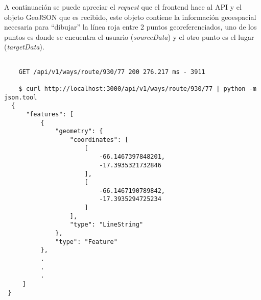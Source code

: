 
A continuación se puede apreciar el \emph{request} que el frontend hace al API y  el objeto GeoJSON que es recibido, este objeto contiene la información geoespacial necesaria para ``dibujar'' la línea roja entre 2 puntos georeferenciados, uno de los puntos es donde se encuentra el usuario (\emph{sourceData}) y el otro punto es el lugar (\emph{targetData}).




\begin{center}
  \begin{lstlisting}[label=call_ways,caption=Llamada al \emph{endpoint} que retorna la ruta óptima.]

    GET /api/v1/ways/route/930/77 200 276.217 ms - 3911

    $ curl http://localhost:3000/api/v1/ways/route/930/77 | python -m json.tool
  {
      "features": [
          {
              "geometry": {
                  "coordinates": [
                      [
                          -66.1467397848201,
                          -17.3935321732846
                      ],
                      [
                          -66.1467190789842,
                          -17.3935294725234
                      ]
                  ],
                  "type": "LineString"
              },
              "type": "Feature"
          },
          .
          .
          .
     ]
 }

  \end{lstlisting}
\end{center}

